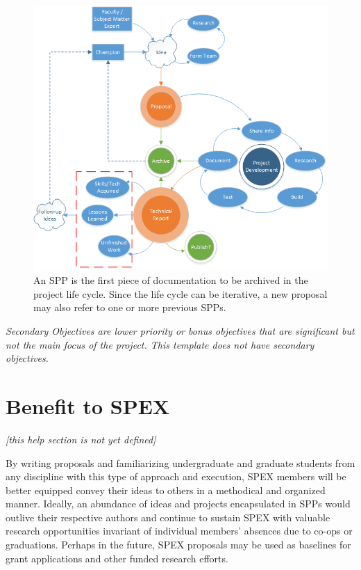 \documentclass[journal]{SPEXformat}
\newcommand*{\HELP}{}%
\begin{document}
\begin{figure}
  \includegraphics[width=\linewidth]{figs/project-life-cycle.png}
  \caption{An SPP is the first piece of documentation to be archived in the project life cycle. Since the life cycle can be iterative, a new proposal may also refer to one or more previous SPPs.}
\label{fig:lifecycle}
\end{figure}

\ifdefined\HELP\em
  Secondary Objectives are lower priority or bonus objectives that are significant but not the main focus of the project. This template does not have secondary objectives.
\em\fi

\section{Benefit to SPEX}
\label{sec:benefit}
\ifdefined\HELP\em
  [this help section is not yet defined]
\em\fi

By writing proposals and familiarizing undergraduate and graduate students from any discipline with this type of approach and execution, SPEX members will be better equipped convey their ideas to others in a methodical and organized manner.
Ideally, an abundance of ideas and projects encapsulated in SPPs would outlive their respective authors and continue to sustain SPEX with valuable research opportunities invariant of individual members' absences due to co-ops or graduations.
Perhaps in the future, SPEX proposals may be used as baselines for grant applications and other funded research efforts.
\end{document}
